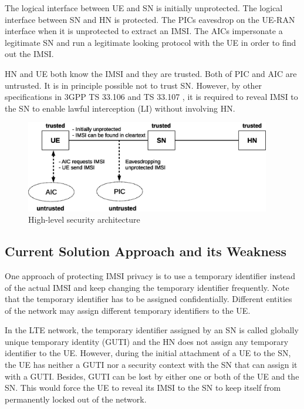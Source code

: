 \documentclass{river-journal}
\begin{document}
The logical interface between UE and SN is initially unprotected. The logical interface between SN and HN is protected. The PICs eavesdrop on the UE-RAN interface when it is unprotected to extract an IMSI. The AICs impersonate a legitimate SN and run a legitimate looking protocol with the UE in order to find out the IMSI. 


HN and UE both know the IMSI and they are trusted. Both of PIC and AIC are untrusted. It is in principle possible not to trust SN. However, by other specifications in 3GPP TS 33.106 \cite{TS33106} and TS 33.107 \cite{TS33107}, it is required to reveal IMSI to the SN to enable lawful interception (LI) without involving HN. \begin{figure}
\begin{center}
  \includegraphics[height= 4cm]{security_architecture_abstraction.eps}
\caption{High-level security architecture}
\label{fig:security_architecture_abstraction}       %
\end{center}
\end{figure} 

\subsection{Current Solution Approach and its Weakness}
One approach of protecting IMSI privacy is to use a temporary identifier instead of the actual IMSI and keep changing the temporary identifier frequently. Note that the temporary identifier has to be assigned confidentially. Different entities of the network may assign different temporary identifiers to the UE. 

In the LTE network, the temporary identifier assigned by an SN is called globally unique temporary identity (GUTI) and the HN does not assign any temporary identifier to the UE. However, during the initial attachment of a UE to the SN, the UE has neither a GUTI nor a security context with the SN that can assign it with a GUTI. Besides, GUTI can be lost by either one or both of the UE and the SN. This would force the UE to reveal its IMSI to the SN to keep itself from permanently locked out of the network.
\end{document}
